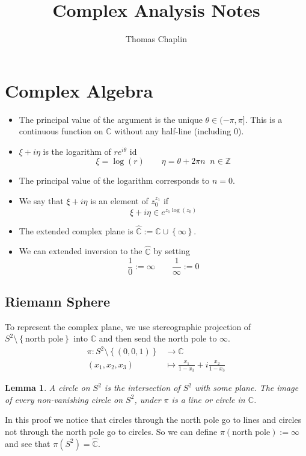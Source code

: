 \documentclass[11pt]{article}
\title{Complex Analysis Notes}
\author{Thomas Chaplin}
\date{}
\newcommand{\defeq}{:=}
\newcommand{\C}{\mathbb{C}}
\newcommand{\Z}{\mathbb{Z}}
\newenvironment{defin}
	{\begin{mdframed}[backgroundcolor=white, roundcorner=5pt, linewidth=1pt]}
	{\end{mdframed}}
\newcommand{\mdf}[1]{{\color{red} #1}}
\newtheorem{lemma}[theorem]{Lemma}
\begin{document}
\maketitle

\section{Complex Algebra}
\begin{defin}
	\begin{itemize}
		\item The \mdf{principal value of the argument} is the unique $\theta\in (-\pi, \pi]$.	
			This is a continuous function on $\C$ without any half-line (including $0$). 
		\item $\xi + i \eta$ is the \mdf{logarithm} of $re^{i\theta}$ id
			\[
				\xi = \log(r) \quad\quad \eta = \theta + 2\pi n \;\; n\in \Z
			\]
		\item The \mdf{principal value of the logarithm} corresponds to $n=0$.
		\item We say that $\xi+ i \eta$ is an element of $z_0^{z_1}$ if
			\[
				\xi + i \eta \in e^{z_1\log(z_0)}
			\]
		\item The \mdf{extended complex plane} is $\hat{\C}\defeq \C \cup \left\{\infty\right\}$.
		\item We can extended inversion to the $\hat{\C}$ by setting
		\[
			\frac{1}{0}\defeq\infty \quad\quad \frac{1}{\infty}\defeq 0
		\]
	\end{itemize}
\end{defin}

\subsection{Riemann Sphere}
To represent the complex plane, we use stereographic projection of $S^2\setminus\left\{\text{north pole}\right\}$ into $\C$ and then send the north pole to $\infty$.
\begin{align*}
	\pi:S^2\setminus\left\{(0,0,1)\right\}&\to \C \\
	(x_1, x_2, x_3) &\mapsto \frac{x_1}{1-x_3}+i\frac{x_2}{1-x_3}
\end{align*}

\begin{lemma}
A \mdf{circle on $S^2$} is the intersection of $S^2$ with some plane.
The image of every non-vanishing circle on $S^2$, under $\pi$ is a line or circle in $\C$.
\end{lemma}

In this proof we notice that circles through the north pole go to lines and circles not through the north pole go to circles.
So we can define $\pi(\text{north pole})\defeq\infty$ and see that $\pi(S^2)=\hat{\C}$.
\end{document}
